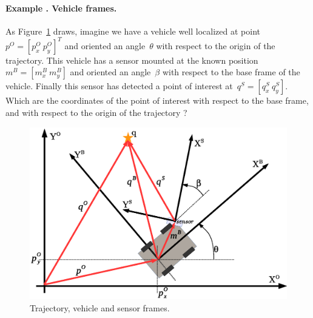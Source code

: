 \paragraph{Example \theexamplecounter. Vehicle frames.}
As Figure~\ref{fig:world_vehicle_sensor_frames} draws, imagine we have a vehicle well localized at point $p^O=\left[p^O_x\ p^O_y\right]^T$ and oriented an angle~$\theta$ with respect to the origin of the trajectory. This vehicle has a sensor mounted at the known position~$m^B=[m^B_x\ m^B_y]$ and oriented an angle~$\beta$ with respect to the base frame of the vehicle. Finally this sensor has detected a point of interest at~$q^S=[q^S_x\ q^S_y]$. Which are the coordinates of the point of interest with respect to the base frame, and with respect to the origin of the trajectory ?
\begin{figure}[bth!]
  \begin{center}
    \includegraphics[width=1.0\columnwidth]{figures/world_vehicle_sensor_frames.eps}
    \caption{Trajectory, vehicle and sensor frames.}
    \label{fig:world_vehicle_sensor_frames}
  \end{center}
\end{figure}

